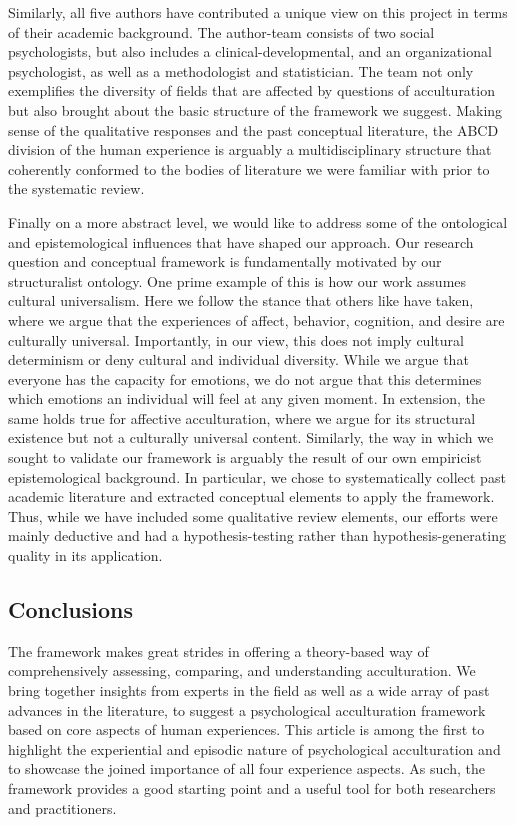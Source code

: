 \documentclass[man, 12pt, a4paper, mask]{apa7}
\begin{document}
Similarly, all five authors have contributed a unique view on this project in terms of their academic background. The author-team consists of two social psychologists, but also includes a clinical-developmental, and an organizational psychologist, as well as a methodologist and statistician. The team not only exemplifies the diversity of fields that are affected by questions of acculturation but also brought about the basic structure of the framework we suggest. Making sense of the qualitative responses and the past conceptual literature, the ABCD division of the human experience is arguably a multidisciplinary structure that coherently conformed to the bodies of literature we were familiar with prior to the systematic review. 

Finally on a more abstract level, we would like to address some of the ontological and epistemological influences that have shaped our approach. Our research question and conceptual framework is fundamentally motivated by our structuralist ontology. One prime example of this is how our work assumes cultural universalism. Here we follow the stance that others like \citet[][]{Berry2009a} have taken, where we argue that the experiences of affect, behavior, cognition, and desire are culturally universal. Importantly, in our view, this does not imply cultural determinism or deny cultural and individual diversity. While we argue that everyone has the capacity for emotions, we do not argue that this determines which emotions an individual will feel at any given moment. In extension, the same holds true for affective acculturation, where we argue for its structural existence but not a culturally universal content. Similarly, the way in which we sought to validate our framework is arguably the result of our own empiricist epistemological background. In particular, we chose to systematically collect past academic literature and extracted conceptual elements to apply the framework. Thus, while we have included some qualitative review elements, our efforts were mainly deductive and had a hypothesis-testing rather than hypothesis-generating quality in its application.

\subsection{Conclusions}
The framework makes great strides in offering a theory-based way of comprehensively assessing, comparing, and understanding acculturation.
We bring together insights from experts in the field as well as a wide array of past advances in the literature, to suggest a psychological acculturation framework based on core aspects of human experiences.
This article is among the first to highlight the experiential and episodic nature of psychological acculturation and to showcase the joined importance of all four experience aspects. 
As such, the framework provides a good starting point and a useful tool for both researchers and practitioners. 
\end{document}
